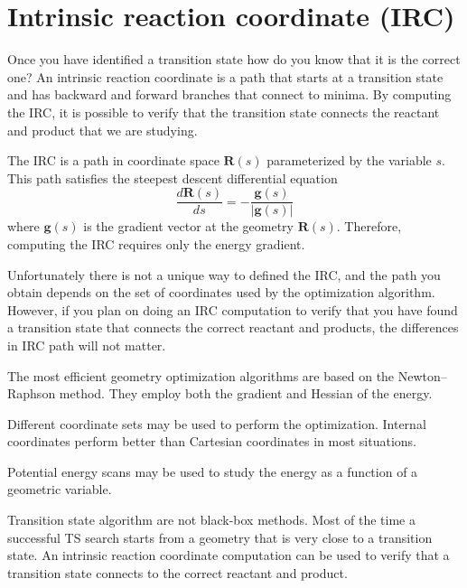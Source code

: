 \documentclass[../Main/notes.tex]{subfiles}
\begin{document}
\section{Intrinsic reaction coordinate (IRC)}

Once you have identified a transition state how do you know that it is the correct one?
An intrinsic reaction coordinate is a path that starts at a transition state and has backward  and forward branches that connect to minima.
By computing the IRC, it is possible to verify that the transition state connects the reactant and product that we are studying.

The IRC is a path in coordinate space $\mathbf{R}(s)$ parameterized by the variable $s$.
This path satisfies the steepest descent differential equation
\begin{equation}
\frac{ d \mathbf{R}(s) }{ d s} = - \frac{\mathbf{g}(s)}{|\mathbf{g}(s)|}
\end{equation}
where $\mathbf{g}(s)$ is the gradient vector at the geometry $\mathbf{R}(s)$.
Therefore, computing the IRC requires only the energy gradient.

Unfortunately there is not a unique way to defined the IRC, and the path you obtain depends on the set of coordinates used by the optimization algorithm.
However, if you plan on doing an IRC computation to verify that you have found a transition state that connects the correct reactant and products, the differences in IRC path will not matter.

\begin{summary}
\item The most efficient geometry optimization algorithms are based on the Newton--Raphson method. They employ both the gradient and Hessian of the energy.
\item Different coordinate sets may be used to perform the optimization. Internal coordinates perform better than Cartesian coordinates in most situations.
\item Potential energy scans may be used to study the energy as a function of a geometric variable.
\item Transition state algorithm are not black-box methods. Most of the time a successful TS search starts from a geometry that is very close to a transition state.
An intrinsic reaction coordinate computation can be used to verify that a transition state connects to the correct reactant and product.
\end{summary}
\end{document}
